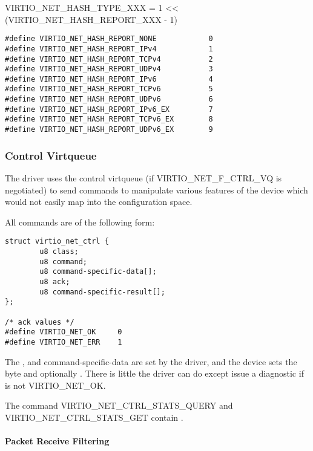 VIRTIO_NET_HASH_TYPE_XXX = 1 << (VIRTIO_NET_HASH_REPORT_XXX - 1)

\begin{lstlisting}
#define VIRTIO_NET_HASH_REPORT_NONE            0
#define VIRTIO_NET_HASH_REPORT_IPv4            1
#define VIRTIO_NET_HASH_REPORT_TCPv4           2
#define VIRTIO_NET_HASH_REPORT_UDPv4           3
#define VIRTIO_NET_HASH_REPORT_IPv6            4
#define VIRTIO_NET_HASH_REPORT_TCPv6           5
#define VIRTIO_NET_HASH_REPORT_UDPv6           6
#define VIRTIO_NET_HASH_REPORT_IPv6_EX         7
#define VIRTIO_NET_HASH_REPORT_TCPv6_EX        8
#define VIRTIO_NET_HASH_REPORT_UDPv6_EX        9
\end{lstlisting}

\subsubsection{Control Virtqueue}\label{sec:Device Types / Network Device / Device Operation / Control Virtqueue}

The driver uses the control virtqueue (if VIRTIO_NET_F_CTRL_VQ is
negotiated) to send commands to manipulate various features of
the device which would not easily map into the configuration
space.

All commands are of the following form:

\begin{lstlisting}
struct virtio_net_ctrl {
        u8 class;
        u8 command;
        u8 command-specific-data[];
        u8 ack;
        u8 command-specific-result[];
};

/* ack values */
#define VIRTIO_NET_OK     0
#define VIRTIO_NET_ERR    1
\end{lstlisting}

The ,  and command-specific-data are set by the
driver, and the device sets the  byte and optionally
. There is little the driver can
do except issue a diagnostic if  is not VIRTIO_NET_OK.

The command VIRTIO_NET_CTRL_STATS_QUERY and VIRTIO_NET_CTRL_STATS_GET contain
.

\paragraph{Packet Receive Filtering}\label{sec:Device Types / Network Device / Device Operation / Control Virtqueue / Packet Receive Filtering}
\label{sec:Device Types / Network Device / Device Operation / Control Virtqueue / Setting Promiscuous Mode}%

